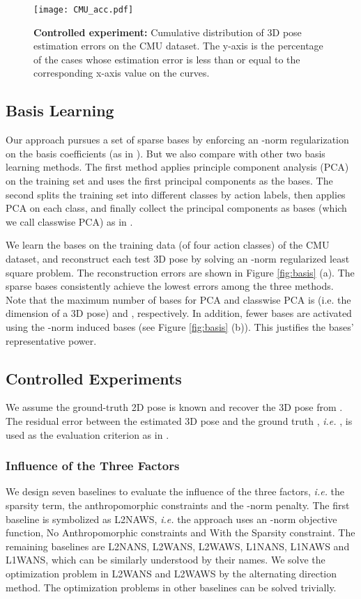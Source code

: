 \documentclass[10pt,twocolumn,letterpaper]{article}
\begin{document}
\begin{figure}
\centering
\texttt{[image: CMU\_acc.pdf]}
\caption{\textbf{Controlled experiment:} Cumulative distribution
of 3D pose estimation errors on the CMU dataset. The y-axis is the percentage of the cases whose estimation error is less than or equal to the corresponding x-axis value on the curves.} \vspace{-1em} \label{fig:CMU_UVA}
\end{figure}

\subsection{Basis Learning}
\label{sec:basislearning} Our approach pursues a set of sparse
bases by enforcing an -norm regularization on the basis
coefficients (as in \cite{MairalSparse}). But we also compare with
other two basis learning methods. The first method applies principle component analysis (PCA) on the training set and uses the first  principal components as the bases. The second splits the training set into
different classes by action labels, then applies PCA on each class,
and finally collect the principal components as bases (which we
call classwise PCA) as in \cite{Ramakrishna}.

We learn the bases on the training data (of
four action classes) of the CMU dataset, and reconstruct each test
3D pose by solving an -norm regularized least square problem.
The reconstruction errors are shown in Figure \ref{fig:basis} (a).
The sparse bases consistently achieve the
lowest errors among the three methods. Note that the maximum
number of bases for PCA and classwise PCA is  (i.e. the
dimension of a 3D pose) and , respectively. In addition,
fewer bases are activated using the -norm induced bases (see Figure \ref{fig:basis}
(b)). This
justifies the bases' representative power.


\subsection{Controlled Experiments}
We assume the ground-truth 2D pose  is known and recover the 3D pose
 from . The residual error between the estimated 3D pose
 and the ground truth , {\em i.e.} , is
used as the evaluation criterion as in \cite{Ramakrishna}.

\subsubsection{Influence of the Three Factors}
\label{sec:threefactors} We design seven baselines to evaluate the
influence of the three factors, {\em i.e.} the sparsity term, the
anthropomorphic constraints and the -norm penalty. The first
baseline is symbolized as L2NAWS, {\em i.e.} the approach uses an -norm objective
function, No Anthropomorphic constraints and With the Sparsity
constraint. The remaining baselines are L2NANS, L2WANS, L2WAWS,
L1NANS, L1NAWS and L1WANS, which can be similarly understood by
their names. We solve the optimization problem in L2WANS and
L2WAWS by the alternating direction method. The optimization
problems in other baselines can be solved trivially.
\end{document}
